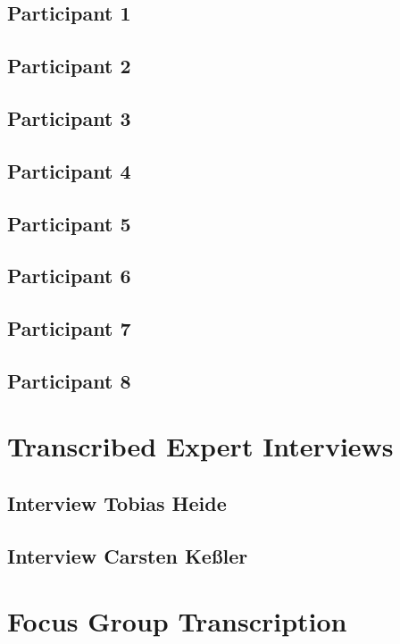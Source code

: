
\subsection{Participant 1}
  

\subsection{Participant 2}
  

\subsection{Participant 3}
  

\subsection{Participant 4}
  

\subsection{Participant 5}
  

\subsection{Participant 6}
  

\subsection{Participant 7}
  
  
\subsection{Participant 8}
  

\section{Transcribed Expert Interviews}
\label{appendix:expert-interviews}

\subsection{Interview Tobias Heide}
  

\subsection{Interview Carsten Ke{\ss}ler}
  
  
\section{Focus Group Transcription}
\label{appendix:focus-interviews}
  
  